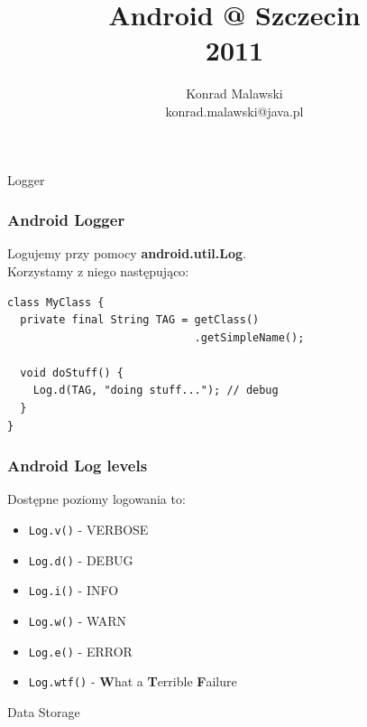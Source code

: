 \documentclass{beamer}
\title{Android @ Szczecin \\ 2011}
\author{Konrad Malawski \\ konrad.malawski@java.pl}
\begin{document}
\begin{frame}
 \begin{center}
  \Huge{Logger}
 \end{center}

\end{frame}



\begin{frame}[fragile]\frametitle{Android Logger}
Logujemy przy pomocy \textbf{android.util.Log}.\\
Korzystamy z niego następująco:

\begin{lstlisting}
class MyClass {
  private final String TAG = getClass()
                             .getSimpleName();

  void doStuff() {
    Log.d(TAG, "doing stuff..."); // debug
  }
}
\end{lstlisting}
\end{frame}

\begin{frame}[fragile]\frametitle{Android Log levels}
Dostępne poziomy logowania to:
\begin{itemize}
 \item \verb|Log.v()| - VERBOSE
 \item \verb|Log.d()| - DEBUG
 \pause \item \verb|Log.i()| - INFO
 \pause \item \verb|Log.w()| - WARN
 \pause \item \verb|Log.e()| - ERROR
 \pause \item \verb|Log.wtf()| \pause - \textbf{W}hat a \textbf{T}errible \textbf{F}ailure
\end{itemize}

\end{frame}

\begin{frame}
 \begin{center}
  \Huge{Data Storage}
 \end{center}

\end{frame}
\end{document}
